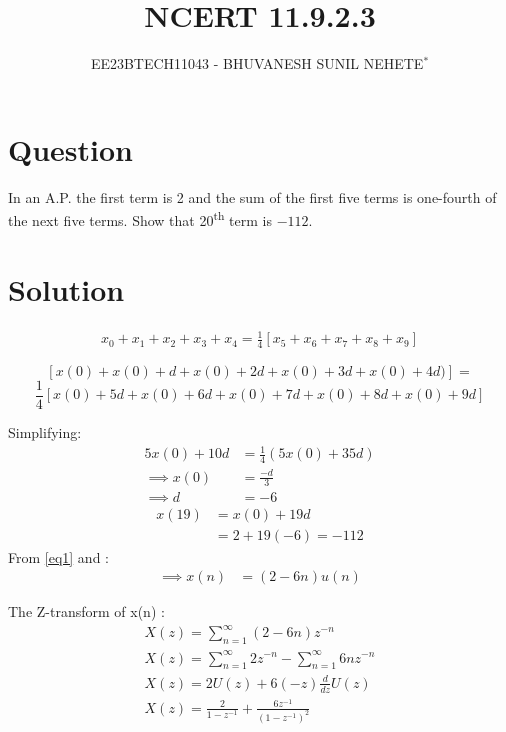 \documentclass[journal,12pt,twocolumn]{IEEEtran}
\theoremstyle{remark}
\begin{document}

\vspace{3cm}

\title{NCERT 11.9.2.3}
\author{EE23BTECH11043 - BHUVANESH SUNIL NEHETE$^{*}$%
}
\maketitle
\newpage
\bigskip

\renewcommand{\thefigure}{\theenumi}
\renewcommand{\thetable}{\theenumi}



\section*{Question}

In an A.P. the first term is 2 and the sum of the first five terms is one-fourth of the next five terms. Show that 20\textsuperscript{th} term is $-112$.

\section*{Solution}



   \begin{align}
        x_0 + x_1 + x_2 + x_3 + x_4 = \frac{1}{4} [x_5 + x_6 + x_7 + x_8 + x_9]
    \end{align}

\[[x(0) + x(0) + d + x(0) + 2d + x(0) + 3d + x(0) + 4d)] =\]
\[\frac{1}{4} [x(0) + 5d + x(0) + 6d + x(0) + 7d + x(0) + 8d + x(0) + 9d]\]

Simplifying:
    \begin{align}
        5x(0) + 10d &= \frac{1}{4}(5x(0) + 35d)\\
        \implies x(0) &= \frac{-d}{3}\\
        \implies d &= -6 \label{eq1}
    \end{align}
    \begin{align}
        x(19)&=x(0)+19d\\
        &=2+19(-6) = -112
    \end{align}
From \eqref{eq1} and :
    \begin{align}
        \implies x(n)&=(2-6n)u(n)
    \end{align}
    
The Z-transform of x(n) :
    \begin{align}
        X(z) = \sum_{n=1}^{\infty} (2 - 6n)z^{-n}\\
        X(z) = \sum_{n=1}^{\infty} 2z^{-n} - \sum_{n=1}^{\infty} 6nz^{-n}\\
        X(z) = 2U(z) + 6(-z)\frac{d}{dz} U(z)\\
        X(z)=\frac{2}{1-z^{-1}}+\frac{6z^{-1}}{(1-z^{-1})^{2}}
    \end{align}
\end{document}
